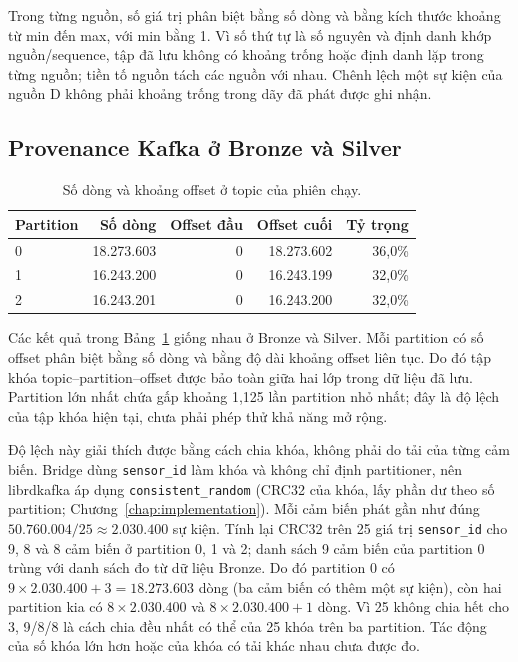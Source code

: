 Trong từng nguồn, số giá trị phân biệt bằng số dòng và bằng kích thước khoảng từ min đến max, với min bằng 1. Vì số thứ tự là số nguyên và định danh khớp nguồn/sequence, tập đã lưu không có khoảng trống hoặc định danh lặp trong từng nguồn; tiền tố nguồn tách các nguồn với nhau. Chênh lệch một sự kiện của nguồn D không phải khoảng trống trong dãy đã phát được ghi nhận.

\subsection{Provenance Kafka ở Bronze và Silver}
\begin{table}[H]
\centering
\caption{Số dòng và khoảng offset ở topic của phiên chạy.}
\label{tab:partition-offsets}
\small
\begin{tabular}{l r r r r}
\toprule
\textbf{Partition} & \textbf{Số dòng} & \textbf{Offset đầu} & \textbf{Offset cuối} & \textbf{Tỷ trọng} \\
\midrule
0 & 18.273.603 & 0 & 18.273.602 & 36,0\% \\
1 & 16.243.200 & 0 & 16.243.199 & 32,0\% \\
2 & 16.243.201 & 0 & 16.243.200 & 32,0\% \\
\bottomrule
\end{tabular}
\end{table}

Các kết quả trong Bảng~\ref{tab:partition-offsets} giống nhau ở Bronze và Silver. Mỗi partition có số offset phân biệt bằng số dòng và bằng độ dài khoảng offset liên tục. Do đó tập khóa topic--partition--offset được bảo toàn giữa hai lớp trong dữ liệu đã lưu. Partition lớn nhất chứa gấp khoảng 1,125 lần partition nhỏ nhất; đây là độ lệch của tập khóa hiện tại, chưa phải phép thử khả năng mở rộng.

Độ lệch này giải thích được bằng cách chia khóa, không phải do tải của từng cảm biến. Bridge dùng \texttt{sensor\_id} làm khóa và không chỉ định partitioner, nên librdkafka áp dụng \texttt{consistent\_random} (CRC32 của khóa, lấy phần dư theo số partition; Chương~\ref{chap:implementation}). Mỗi cảm biến phát gần như đúng $50.760.004/25\approx2.030.400$ sự kiện. Tính lại CRC32 trên 25 giá trị \texttt{sensor\_id} cho 9, 8 và 8 cảm biến ở partition 0, 1 và 2; danh sách 9 cảm biến của partition 0 trùng với danh sách đo từ dữ liệu Bronze. Do đó partition 0 có $9\times2.030.400+3=18.273.603$ dòng (ba cảm biến có thêm một sự kiện), còn hai partition kia có $8\times2.030.400$ và $8\times2.030.400+1$ dòng. Vì 25 không chia hết cho 3, 9/8/8 là cách chia đều nhất có thể của 25 khóa trên ba partition. Tác động của số khóa lớn hơn hoặc của khóa có tải khác nhau chưa được đo.


